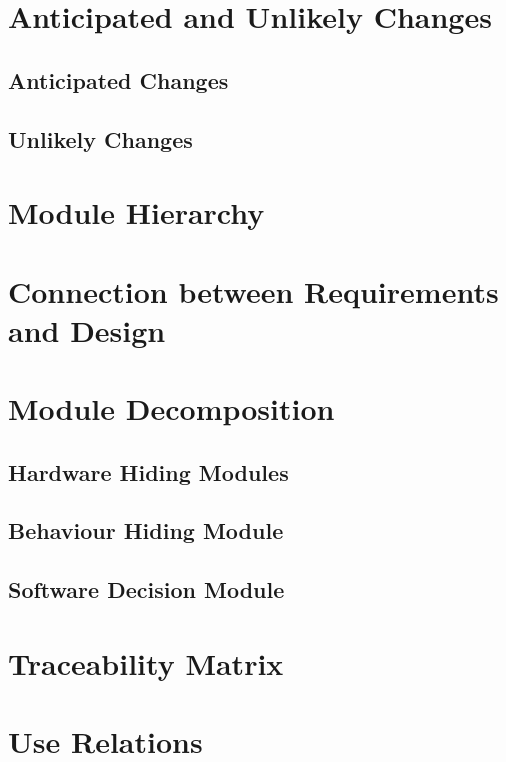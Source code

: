 \documentclass{article}
\begin{document}
\section{Anticipated and Unlikely Changes}
\subsection{Anticipated Changes}
\subsection{Unlikely Changes}

\section{Module Hierarchy}

\section{Connection between Requirements and Design}

\section{Module Decomposition}
\subsection{Hardware Hiding Modules}
\subsection{Behaviour Hiding Module}
\subsection{Software Decision Module}

\section{Traceability Matrix}

\section{Use Relations}

\newpage
\listoftables
\listoffigures
\end{document}
